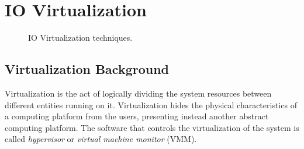 \chapter{IO Virtualization}
\label{chap:virt}

\begin{figure}[!ht]
  \centering
    \hfill
    \hfill
    \caption{IO Virtualization techniques.
      \label{fig:storage}}
    
\end{figure}




\section{Virtualization Background}
Virtualization is the act of logically dividing the system resources between different entities
running on it. Virtualization hides the physical characteristics of a computing platform from the users,
presenting instead another abstract computing platform. The software that controls the virtualization of the
system is called \emph{hypervisor} or \emph{virtual machine monitor} (VMM).

